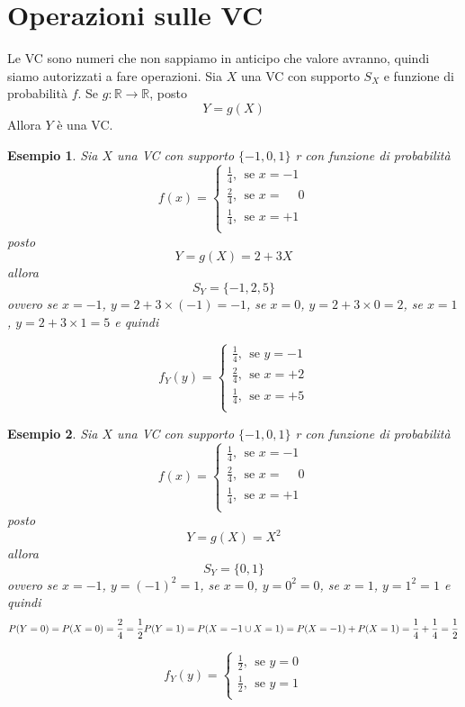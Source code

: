 \documentclass[
  11pt,
]{book}
\theoremstyle{mytheoremstyle}
\theoremstyle{mydefstyle}
\newtheorem{example}{{Esempio}}[section]
\begin{document}
\section{Operazioni sulle VC}\label{operazioni-sulle-vc}

Le VC sono numeri che non sappiamo in anticipo che valore avranno, quindi siamo autorizzati
a fare operazioni. Sia \(X\) una VC con supporto \(S_X\) e funzione di probabilità \(f\). Se
\(g:\mathbb{R}\to\mathbb{R}\), posto
\[
 Y = g(X)
\]
Allora \(Y\) è una VC.

\begin{example}
Sia \(X\) una VC con supporto \(\{-1,0,1\}\) r con funzione di probabilità
\[
f(x)= \begin{cases}
\frac 14,~~\text{se $x=-1$}\\
\frac 24,~~\text{se $x=\phantom-0$}\\
\frac 14,~~\text{se $x=+1$}\\
\end{cases}
\]
posto
\[
Y=g(X)= 2 + 3X
\]
allora
\[
S_Y = \{-1, 2, 5\}
\]
ovvero se \(x=-1\), \(y=2+3\times(-1)=-1\), se \(x=0\), \(y=2+3\times0=2\), se \(x=1\), \(y=2+3\times1=5\) e quindi

\[
f_Y(y)= \begin{cases}
\frac 14,~~\text{se $y=-1$}\\
\frac 24,~~\text{se $x=+2$}\\
\frac 14,~~\text{se $x=+5$}\\
\end{cases}
\]
\end{example}

\begin{example}
Sia \(X\) una VC con supporto \(\{-1,0,1\}\) r con funzione di probabilità
\[
f(x)= \begin{cases}
\frac 14,~~\text{se $x=-1$}\\
\frac 24,~~\text{se $x=\phantom-0$}\\
\frac 14,~~\text{se $x=+1$}\\
\end{cases}
\]
posto
\[
Y=g(X)= X^2
\]
allora
\[
S_Y = \{0,1\}
\]
ovvero se \(x=-1\), \(y=(-1)^2=1\), se \(x=0\), \(y=0^2=0\), se \(x=1\), \(y=1^2=1\) e quindi
\[
P(Y=0) = P(X=0) = \frac 24 = \frac 12\\
P(Y=1) = P(X=-1 \cup X = 1) = P(X=-1) + P(X = 1) = \frac 14+\frac14=\frac12
\]

\[
f_Y(y)= \begin{cases}
\frac 12,~~\text{se $y=0$}\\
\frac 12,~~\text{se $y=1$}\\
\end{cases}
\]
\end{example}
\end{document}
